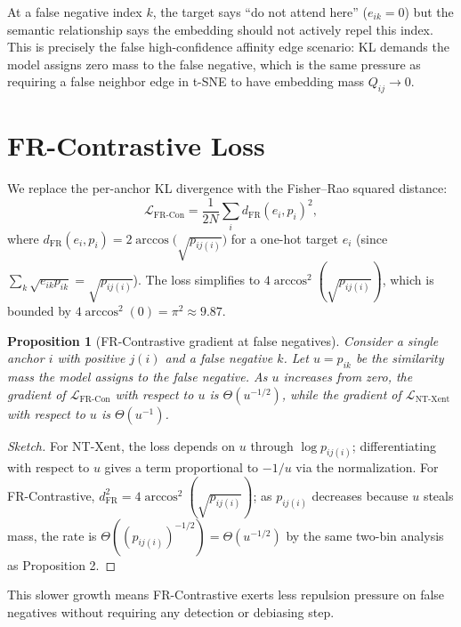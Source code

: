 \documentclass[11pt]{article}
\newtheorem{proposition}{Proposition}
\begin{document}
At a false negative index $k$, the target says ``do not attend here'' ($e_{ik} = 0$) but
the semantic relationship says the embedding should not actively repel this index. This is
precisely the false high-confidence affinity edge scenario: KL demands the model assigns
zero mass to the false negative, which is the same pressure as requiring a false neighbor
edge in t-SNE to have embedding mass $Q_{ij} \to 0$.

\section{FR-Contrastive Loss}

We replace the per-anchor KL divergence with the Fisher--Rao squared distance:
\begin{equation}
  \mathcal{L}_{\mathrm{FR\text{-}Con}}
  = \frac{1}{2N}\sum_i d_{\mathrm{FR}}(e_i, p_i)^2,
  \label{eq:frcon}
\end{equation}
where $d_{\mathrm{FR}}(e_i, p_i) = 2\arccos\bigl(\sqrt{p_{ij(i)}}\bigr)$ for a one-hot
target $e_i$ (since $\sum_k \sqrt{e_{ik} p_{ik}} = \sqrt{p_{ij(i)}}$). The loss
simplifies to $4\arccos^2(\sqrt{p_{ij(i)}})$, which is bounded by $4\arccos^2(0) = \pi^2
\approx 9.87$.

\begin{proposition}[FR-Contrastive gradient at false negatives]
\label{prop:gradient}
Consider a single anchor $i$ with positive $j(i)$ and a false negative $k$. Let $u =
p_{ik}$ be the similarity mass the model assigns to the false negative. As $u$ increases
from zero, the gradient of $\mathcal{L}_{\mathrm{FR\text{-}Con}}$ with respect to $u$ is
$\Theta(u^{-1/2})$, while the gradient of $\mathcal{L}_{\mathrm{NT\text{-}Xent}}$ with
respect to $u$ is $\Theta(u^{-1})$.
\end{proposition}
\begin{proof}[Sketch]
For NT-Xent, the loss depends on $u$ through $\log p_{ij(i)}$; differentiating with respect
to $u$ gives a term proportional to $-1/u$ via the normalization. For FR-Contrastive,
$d_{\mathrm{FR}}^2 = 4\arccos^2(\sqrt{p_{ij(i)}})$; as $p_{ij(i)}$ decreases because $u$
steals mass, the rate is $\Theta((p_{ij(i)})^{-1/2}) = \Theta(u^{-1/2})$ by the same
two-bin analysis as \citet{bottoni2026fisherrao} Proposition 2.
\end{proof}

This slower growth means FR-Contrastive exerts less repulsion pressure on false negatives
without requiring any detection or debiasing step.
\end{document}
